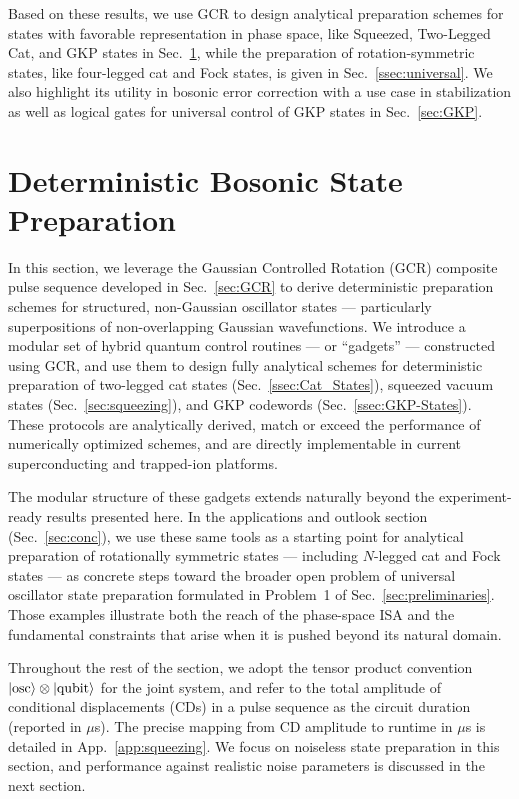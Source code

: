 \documentclass[aps,prx,showpacs,notitlepage,twocolumn,superscriptaddress,nofootinbib,preprintnumbers,floatfix,10pt, longbibliography]{revtex4-2}
\begin{document}
Based on these results, we use GCR to design analytical preparation schemes for states with favorable representation in phase space, like Squeezed, Two-Legged Cat, and GKP states in Sec.~\ref{sec:state_prep}, while the preparation of rotation-symmetric states, like four-legged cat and Fock states, is given in Sec.~\ref{ssec:universal}. We also highlight its utility in bosonic error correction with a use case in stabilization as well as logical gates for universal control of GKP states in Sec.~\ref{sec:GKP}.
\section{Deterministic Bosonic State Preparation}\label{sec:state_prep}
In this section, we leverage the Gaussian Controlled Rotation (GCR)
composite pulse sequence developed in Sec.~\ref{sec:GCR} to derive
deterministic preparation schemes for structured, non-Gaussian oscillator
states — particularly superpositions of non-overlapping Gaussian
wavefunctions.  We introduce a modular set of hybrid quantum control
routines — or ``gadgets'' — constructed using GCR, and use them to design
fully analytical schemes for deterministic preparation of two-legged cat
states (Sec.~\ref{ssec:Cat_States}), squeezed vacuum states
(Sec.~\ref{sec:squeezing}), and GKP codewords
(Sec.~\ref{ssec:GKP-States}).  These protocols are analytically derived,
match or exceed the performance of numerically optimized schemes, and are
directly implementable in current superconducting and trapped-ion
platforms.

The modular structure of these gadgets extends naturally beyond the
experiment-ready results presented here.  In the applications and outlook
section (Sec.~\ref{sec:conc}), we use these same tools as a starting
point for analytical preparation of rotationally symmetric states —
including $N$-legged cat and Fock states — as concrete steps toward the
broader open problem of universal oscillator state preparation formulated
in Problem~1 of Sec.~\ref{sec:preliminaries}.  Those examples illustrate
both the reach of the phase-space ISA and the fundamental constraints that
arise when it is pushed beyond its natural domain.

Throughout the rest of the section, we adopt the tensor product convention $\ket{\mathrm{osc}}\otimes\ket{\mathrm{qubit}}$ for the joint system, and refer to the total amplitude of conditional displacements (CDs) in a pulse sequence as the circuit duration (reported in $\mu$s). The precise mapping from CD amplitude to runtime in $\mu$s is detailed in App.~\ref{app:squeezing}. We focus on noiseless state preparation in this section, and performance against realistic noise parameters is discussed in the next section.
\end{document}
